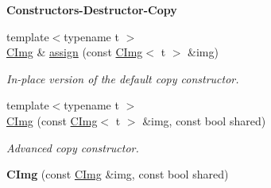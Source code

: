 \begin{Indent}{\bf Constructors-\/\-Destructor-\/\-Copy}
\begin{DoxyCompactItemize}
\item 
{\footnotesize template$<$typename t $>$ }\\\hyperlink{structcimg__library_1_1_c_img}{C\-Img} \& \hyperlink{structcimg__library_1_1_c_img_a7adf0edeca1ab85b0d23f3900ca51fb6}{assign} (const \hyperlink{structcimg__library_1_1_c_img}{C\-Img}$<$ t $>$ \&img)
\begin{DoxyCompactList}\small\item\em In-\/place version of the default copy constructor. \end{DoxyCompactList}\item 
{\footnotesize template$<$typename t $>$ }\\\hyperlink{structcimg__library_1_1_c_img_ab2bc3f0c5730c1f57dfb8b920954444f}{C\-Img} (const \hyperlink{structcimg__library_1_1_c_img}{C\-Img}$<$ t $>$ \&img, const bool shared)
\begin{DoxyCompactList}\small\item\em Advanced copy constructor. \end{DoxyCompactList}\item 
\hypertarget{structcimg__library_1_1_c_img_a465b4e6c2064989dadd85183c7cdd7e6}{{\bfseries C\-Img} (const \hyperlink{structcimg__library_1_1_c_img}{C\-Img} \&img, const bool shared)}\label{structcimg__library_1_1_c_img_a465b4e6c2064989dadd85183c7cdd7e6}


\end{DoxyCompactItemize}
\end{Indent}
